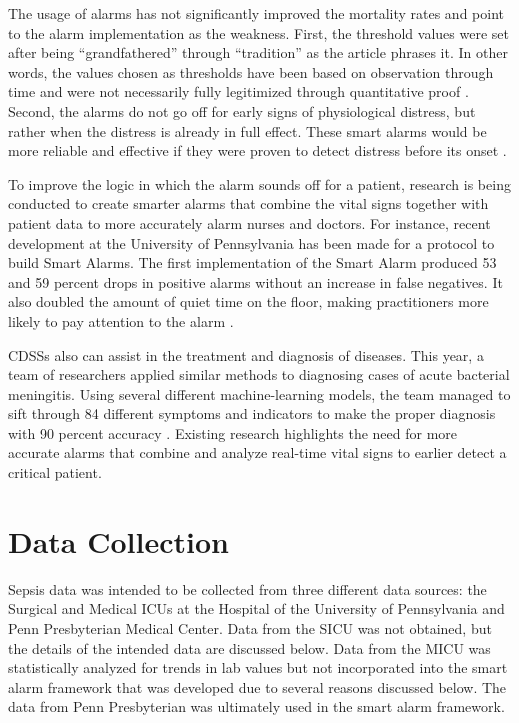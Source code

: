 \documentclass{sig-alternate}
\begin{document}
The usage of alarms has not significantly improved the mortality rates and point to the alarm implementation as the weakness. First, the threshold values were set after being ``grandfathered'' through ``tradition'' as the article phrases it. In other words, the values chosen as thresholds have been based on observation through time and were not necessarily fully legitimized through quantitative proof \cite{deaths}. Second, the alarms do not go off for early signs of physiological distress, but rather when the distress is already in full effect. These smart alarms would be more reliable and effective if they were proven to detect distress before its onset \cite{deaths}.  

To improve the logic in which the alarm sounds off for a patient, research is being conducted to create smarter alarms that combine the vital signs together with patient data to more accurately alarm nurses and doctors. For instance, recent development at the University of Pennsylvania has been made for a protocol to build Smart Alarms. The first implementation of the Smart Alarm produced 53 and 59 percent drops in positive alarms without an increase in false negatives. It also doubled the amount of quiet time on the floor, making practitioners more likely to pay attention to the alarm \cite{smart_alarm}.

CDSSs also can assist in the treatment and diagnosis of diseases. This year, a team of researchers applied similar methods to diagnosing cases of acute bacterial meningitis. Using several different machine-learning models, the team managed to sift through 84 different symptoms and indicators to make the proper diagnosis with 90 percent accuracy \cite{bayes}. Existing research highlights the need for more accurate alarms that combine and analyze real-time vital signs to earlier detect a critical patient. 

\vspace{10pt}
\section{Data Collection}
\vspace{10pt}
\label{sec:data}

Sepsis data was intended to be collected from three different data sources: the Surgical and Medical ICUs at the Hospital of the University of Pennsylvania and Penn Presbyterian Medical Center.  Data from the SICU was not obtained, but the details of the intended data are discussed below.  Data from the MICU was statistically analyzed for trends in lab values but not incorporated into the smart alarm framework that was developed due to several reasons discussed below.  The data from Penn Presbyterian was ultimately used in the smart alarm framework.
\end{document}
